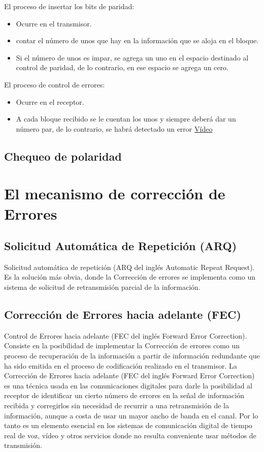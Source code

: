 El proceso de insertar los bits de paridad:
\begin{itemize}
    \item Ocurre en el transmisor.
    \item contar el número de unos que hay en la información que se aloja en el bloque.
    \item Si el número de unos es impar, se agrega un uno en el espacio destinado al control de paridad, de lo contrario, en ese espacio se agrega un cero.
\end{itemize}

El proceso de control de errores:

\begin{itemize}
    \item Ocurre en el receptor.
    \item A cada bloque recibido se le cuentan los unos y siempre deberá dar un número par, de lo contrario, se habrá detectado un error \textcolor{blue}{\href{https://www.youtube.com/watch?v=pUBdJi6eVYA}{Vídeo}}
\end{itemize}

\subsection{Chequeo de polaridad}

\section{El mecanismo de corrección de Errores}

\subsection{Solicitud Automática de Repetición (ARQ)}

Solicitud automática de repetición (ARQ del inglés Automatic Repeat Request). Es la solución más obvia, donde la Corrección de errores se implementa como un sistema de solicitud de retransmisión parcial de la información.

\subsection{Corrección de Errores hacia adelante (FEC)}

Control de Errores hacia adelante (FEC del inglés Forward Error Correction). Consiste en la posibilidad de implementar la Corrección de errores como un proceso de recuperación de la información a partir de información redundante que ha sido emitida en el proceso de codificación realizado en el transmisor.
La Corrección de Errores hacia adelante (FEC del inglés Forward Error Correction) es una técnica usada en las comunicaciones digitales para darle la posibilidad al receptor de identificar un cierto número de errores en la señal de información recibida y corregirlos sin necesidad de recurrir a una retransmisión de la información, aunque a costa de usar un mayor ancho de banda en el canal. Por lo tanto es un elemento esencial en los sistemas de comunicación digital de tiempo real de voz, vídeo y otros servicios donde no resulta conveniente usar métodos de transmisión. \\

